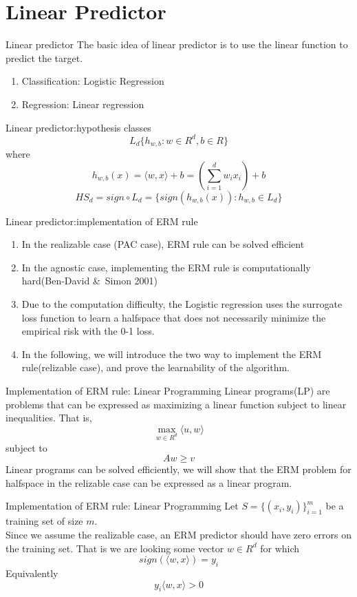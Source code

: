 \documentclass{beamer}
\begin{document}
\section{Linear Predictor}

\begin{frame}{Linear predictor}
	The basic idea of linear predictor is to use the linear function to predict the target.
	\begin{enumerate}
			\item Classification: Logistic Regression
			\item Regression: Linear regression
	\end{enumerate}
\end{frame}
\begin{frame}{Linear predictor:hypothesis classes}
	\[L_d\{h_{w,b}: w \in R^d,b \in R\}\]
	where
	\[h_{w,b}(x) = \langle w,x \rangle +b = (\sum^d_{i=1} w_i x_i) + b\]
	\[HS_d = sign \circ L_d = \{sign(h_{w,b}(x)):h_{w,b} \in L_d\}\]
\end{frame}
\begin{frame}{Linear predictor:implementation of ERM rule}
	\begin{enumerate}
		\item In the realizable case (PAC case), ERM rule can be solved efficient
		\item In the agnostic case, implementing the ERM rule is computationally hard(Ben-David \&\ Simon 2001)
		\item Due to the computation difficulty, the Logistic regression uses the surrogate loss function to learn a halfspace that does not necessarily minimize the empirical risk with the 0-1 loss. 
		\item In the following, we will introduce the two way to implement the ERM rule(relizable case), and prove the learnability of the algorithm.
	\end{enumerate}
\end{frame}
\begin{frame}{Implementation of ERM rule: Linear Programming}
	Linear programs(LP) are problems that can be expressed as maximizing a linear function subject to linear inequalities. That is,
	\[\max_{w \in R^d} \langle u,w \rangle \]
	subject to
	\[Aw \geq v\]
	Linear programs can be solved efficiently, we will show that the ERM problem for halfspace in the relizable case can be expressed as a linear program.
\end{frame}
\begin{frame}{Implementation of ERM rule: Linear Programming}
	Let $S = \{(x_i,y_i)\}^m_{i=1}$ be a training set of size $m$. \\
	Since we assume the realizable case, an ERM predictor should have zero errors on the training set. That is we are looking some vector $w \in R^d$ for which
	\[sign(\langle w,x \rangle) = y_i\]
	Equivalently
	\[y_i \langle w,x \rangle > 0\]
\end{frame}
\end{document}
